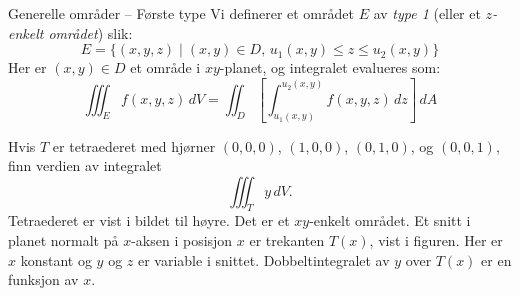 \begin{defn}{Generelle områder – Første type}
Vi definerer et området $E$ av \emph{type 1} (eller et $z$\emph{-enkelt området}) slik:
\[
E = \{(x, y, z) \mid (x, y) \in D,\, u_1(x, y) \leq z \leq u_2(x, y)\}
\]
Her er $(x, y) \in D$ et område i $xy$-planet, og integralet evalueres som:
\[
\iiint_E f(x, y, z)\, dV = \iint_D \left[\int_{u_1(x,y)}^{u_2(x,y)} f(x, y, z)\, dz\right]\, dA
\]
\end{defn}
\begin{eks}{}%
\begin{minipage}{6cm}
Hvis \( T \) er tetraederet med hjørner \((0, 0, 0)\), \((1, 0, 0)\), \((0, 1, 0)\), og \((0, 0, 1)\), finn verdien av integralet
\[
\iiint_T y \, dV.
\]
Tetraederet er vist i bildet til høyre. Det er et $xy$-enkelt området. Et snitt i planet normalt på \(x\)-aksen i posisjon \(x\) er trekanten \(T(x)\), vist i figuren. Her er \(x\) konstant og \(y\) og \(z\) er variable i snittet. Dobbeltintegralet av \(y\) over \(T(x)\) er en funksjon av \(x\).
\end{minipage} 
\begin{minipage}{8cm}
\end{minipage}


\end{eks}
